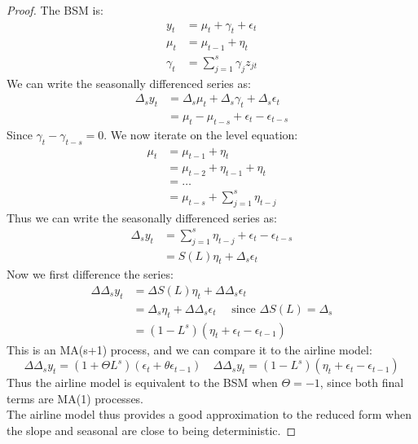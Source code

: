 \documentclass[DIV=14,titlepage=false]{scrreprt}
\begin{document}
\begin{proof}
    The BSM is:
    \begin{align*}
        y_t &= \mu_t + \gamma_t + \epsilon_t\\
        \mu_t &= \mu_{t-1}  + \eta_t\\
        \gamma_t &= \sum_{j=1}^s \gamma_j z_{jt}
    \end{align*}
    We can write the seasonally differenced series as:
    \begin{align*}
        \Delta_s y_t &= \Delta_s \mu_t + \Delta_s \gamma_t + \Delta_s \epsilon_t\\
        &= \mu_t - \mu_{t-s} + \epsilon_t - \epsilon_{t-s}
    \end{align*}
    Since $\gamma_t - \gamma_{t-s} = 0$. We now iterate on the level equation:
    \begin{align*}
        \mu_t &= \mu_{t-1} + \eta_t\\
        &= \mu_{t-2} + \eta_{t-1} + \eta_t\\
        &= \ldots\\
        &= \mu_{t-s} + \sum_{j=1}^s \eta_{t-j}
    \end{align*}
    Thus we can write the seasonally differenced series as:
    \begin{align*}
        \Delta_s y_t &= \sum_{j=1}^s \eta_{t-j} + \epsilon_t - \epsilon_{t-s}\\
        &= S(L) \eta_t + \Delta_s \epsilon_t
    \end{align*}
    Now we first difference the series:
    \begin{align*}
        \Delta \Delta_s y_t &= \Delta S(L) \eta_t + \Delta \Delta_s \epsilon_t\\
        &= \Delta_s \eta_t + \Delta \Delta_s \epsilon_t \quad \text{ since $\Delta S(L) = \Delta_s$}\\
        &= (1-L^s) (\eta_t + \epsilon_t - \epsilon_{t-1}) 
    \end{align*}
    This is an MA(s+1) process, and we can compare it to the airline model:
    \[
        \Delta \Delta_s y_t = (1+\Theta L^s)(\epsilon_t + \theta \epsilon_{t-1}) \quad \Delta \Delta_s y_t = (1-L^s)(\eta_t + \epsilon_t - \epsilon_{t-1})
    \]
    Thus the airline model is equivalent to the BSM when $\Theta = -1$, since both final terms are MA(1) processes.\\
    The airline model thus provides a good approximation to the reduced form when the slope and seasonal are close to being deterministic.
\end{proof}
\end{document}
